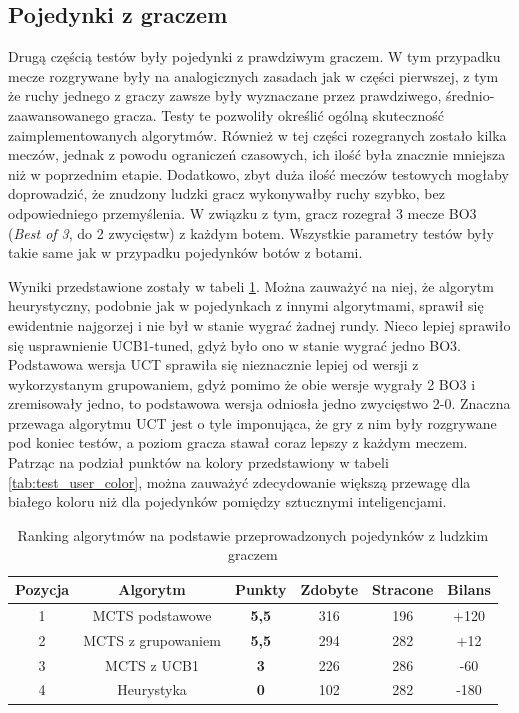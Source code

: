 \documentclass[10pt]{article}
\begin{document}
\subsection{Pojedynki z graczem}
Drugą częścią testów były pojedynki z prawdziwym graczem. W tym przypadku mecze rozgrywane były na analogicznych zasadach jak w części pierwszej, z tym że ruchy jednego z graczy zawsze były wyznaczane przez prawdziwego, średnio-zaawansowanego gracza. Testy te pozwoliły określić ogólną skuteczność zaimplementowanych algorytmów. Również w tej części rozegranych zostało kilka meczów, jednak z powodu ograniczeń czasowych, ich ilość była znacznie mniejsza niż w poprzednim etapie. Dodatkowo, zbyt duża ilość meczów testowych mogłaby doprowadzić, że znudzony ludzki gracz wykonywałby ruchy szybko, bez odpowiedniego przemyślenia. W związku z tym, gracz rozegrał 3 mecze BO3 (\textit{Best of 3}, do 2 zwycięstw) z każdym botem. Wszystkie parametry testów były takie same jak w przypadku pojedynków botów z botami.

Wyniki przedstawione zostały w tabeli \ref{tab:test_user}. Można zauważyć na niej, że algorytm heurystyczny, podobnie jak w pojedynkach z innymi algorytmami, sprawił się ewidentnie najgorzej i nie był w stanie wygrać żadnej rundy. Nieco lepiej sprawiło się usprawnienie UCB1-tuned, gdyż było ono w stanie wygrać jedno BO3. Podstawowa wersja UCT sprawiła się nieznacznie lepiej od wersji z wykorzystanym grupowaniem, gdyż pomimo że obie wersje wygrały 2 BO3 i zremisowały jedno, to podstawowa wersja odniosła jedno zwycięstwo 2-0. Znaczna przewaga algorytmu UCT jest o tyle imponująca, że gry z nim były rozgrywane pod koniec testów, a poziom gracza stawał coraz lepszy z każdym meczem. Patrząc na podział punktów na kolory przedstawiony w tabeli \ref{tab:test_user_color}, można zauważyć zdecydowanie większą przewagę dla białego koloru niż dla pojedynków pomiędzy sztucznymi inteligencjami.

\begin{table}[H]
\centering
\begin{tabularx}{0.7\textwidth}{c|c|c|c|c|c}
\hline
Pozycja & Algorytm & Punkty & Zdobyte & Stracone & Bilans \\
\hline \hline
1 & MCTS podstawowe & \textbf{5,5} & 316 & 196 & +120 \\
2 & MCTS z grupowaniem & \textbf{5,5} & 294 & 282 & +12 \\
3 & MCTS z UCB1 & \textbf{3} & 226 & 286 & -60\\
4 & Heurystyka & \textbf{0} & 102 & 282 & -180 \\
\hline
\end{tabularx}
\caption{Ranking algorytmów na podstawie przeprowadzonych pojedynków z ludzkim graczem}
\label{tab:test_user}
\end{table}
\end{document}
